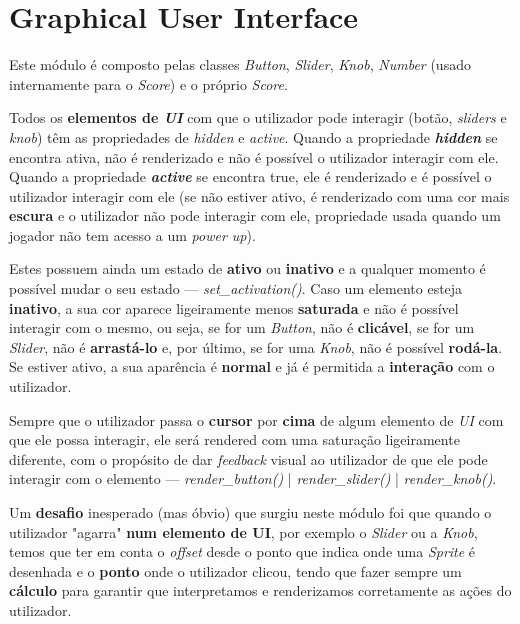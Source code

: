 \documentclass{report}
\begin{document}
\section{Graphical User Interface}

Este módulo é composto pelas classes \textit{Button}, \textit{Slider}, \textit{Knob}, \textit{Number} (usado internamente para o \textit{Score}) e o próprio \textit{Score}.

Todos os \textbf{elementos de \textit{UI}} com que o utilizador pode interagir (botão, \textit{sliders} e \textit{knob}) têm as propriedades de \textit{hidden} e \textit{active}. Quando a propriedade \textbf{\textit{hidden}} se encontra ativa, não é renderizado e não é possível o utilizador interagir com ele. Quando a propriedade \textbf{\textit{active}} se encontra true, ele é renderizado e é possível o utilizador interagir com ele (se não estiver ativo, é renderizado com uma cor mais \textbf{escura} e o utilizador não pode interagir com ele, propriedade usada quando um jogador não tem acesso a um \textit{power up}).

Estes possuem ainda um estado de \textbf{ativo} ou \textbf{inativo} e a qualquer momento é possível mudar o seu estado --- \textit{set\_activation()}. Caso um elemento esteja \textbf{inativo}, a sua cor aparece ligeiramente menos \textbf{saturada} e não é possível interagir com o mesmo, ou seja, se for um \textit{Button}, não é \textbf{clicável}, se for um \textit{Slider}, não é \textbf{arrastá-lo} e, por último, se for uma \textit{Knob}, não é possível \textbf{rodá-la}. Se estiver ativo, a sua aparência é \textbf{normal} e já é permitida a \textbf{interação} com o utilizador.

Sempre que o utilizador passa o \textbf{cursor} por \textbf{cima} de algum elemento de \textit{UI} com que ele possa interagir, ele será rendered com uma saturação ligeiramente diferente, com o propósito de dar \textit{feedback} visual ao utilizador de que ele pode interagir com o elemento --- \textit{render\_button()} | \textit{render\_slider()} | \textit{render\_knob()}.

Um \textbf{desafio} inesperado (mas óbvio) que surgiu neste módulo foi que quando o utilizador "agarra" \textbf{num elemento de UI}, por exemplo o \textit{Slider} ou a \textit{Knob}, temos que ter em conta o \textit{offset} desde o ponto que indica onde uma \textit{Sprite} é desenhada e o \textbf{ponto} onde o utilizador clicou, tendo que fazer sempre um \textbf{cálculo} para garantir que interpretamos e renderizamos corretamente as ações do utilizador.  
\end{document}
